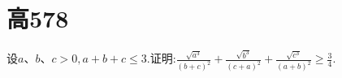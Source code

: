 \documentclass[question]{article}
\title{}
\author{}
\date{}
\begin{document}
\maketitle
\section{高578}{
设$a、b、c>0,a+b+c\leq 3.$证明:$\displaystyle\frac{\sqrt{a^3}}{(b+c)^2}+\frac{\sqrt{b^3}}{(c+a)^2}+\frac{\sqrt{c^3}}{(a+b)^2}\geq \frac{3}{4}$.
}
\end{document}
